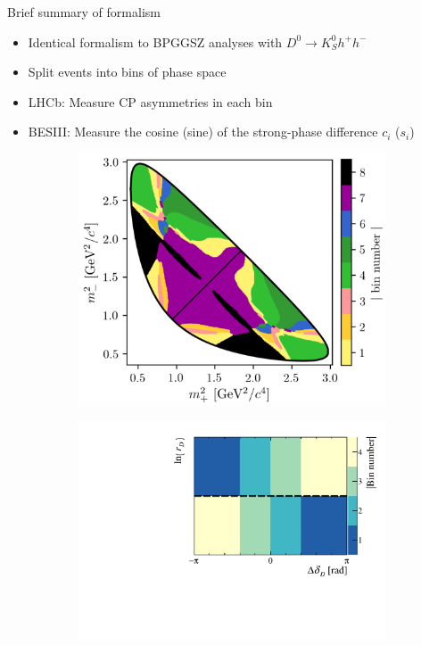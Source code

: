 \documentclass{beamer}
\begin{document}
\begin{frame}{Brief summary of formalism}
  \begin{itemize}
    \setlength\itemsep{0.5em}
    \item{Identical formalism to BPGGSZ analyses with $D^0\to K_S^0h^+h^-$}
    \item{Split events into bins of phase space}
    \item{LHCb: Measure CP asymmetries in each bin}
    \item{BESIII: Measure the cosine (sine) of the strong-phase difference $c_i$ ($s_i$)}
  \end{itemize}
  \begin{figure}
    \centering
    \begin{subfigure}{0.37\textwidth}
      \includegraphics[width = 1.0\textwidth]{Plots/DalitzKSpipi.png}
    \end{subfigure}%
    \hspace{1cm}
    \begin{subfigure}{0.42\textwidth}
      \includegraphics[width = 1.0\textwidth]{Plots/BinningSchemePlot_4Bins.pdf}

\end{subfigure}
\end{figure}
\end{frame}
\end{document}
